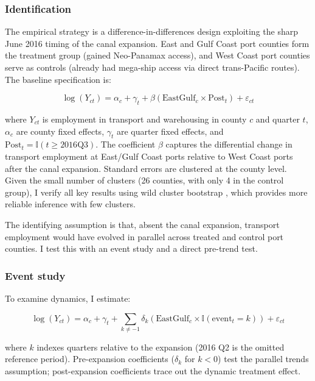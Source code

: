 \documentclass[12pt]{article}
\begin{document}
\subsubsection*{Identification} The empirical strategy is a difference-in-differences design exploiting the sharp June 2016 timing of the canal expansion. East and Gulf Coast port counties form the treatment group (gained Neo-Panamax access), and West Coast port counties serve as controls (already had mega-ship access via direct trans-Pacific routes). The baseline specification is:

\begin{equation}
\log(Y_{ct}) = \alpha_c + \gamma_t + \beta (\text{EastGulf}_c \times \text{Post}_t) + \varepsilon_{ct}
\label{eq:did}
\end{equation}

\noindent where $Y_{ct}$ is employment in transport and warehousing in county $c$ and quarter $t$, $\alpha_c$ are county fixed effects, $\gamma_t$ are quarter fixed effects, and $\text{Post}_t = \mathbb{I}(t \geq 2016\text{Q3})$. The coefficient $\beta$ captures the differential change in transport employment at East/Gulf Coast ports relative to West Coast ports after the canal expansion. Standard errors are clustered at the county level. Given the small number of clusters (26 counties, with only 4 in the control group), I verify all key results using wild cluster bootstrap \citep{cameron2008}, which provides more reliable inference with few clusters.

The identifying assumption is that, absent the canal expansion, transport employment would have evolved in parallel across treated and control port counties. I test this with an event study and a direct pre-trend test.

\subsubsection*{Event study} To examine dynamics, I estimate:

\begin{equation}
\log(Y_{ct}) = \alpha_c + \gamma_t + \sum_{k \neq -1} \delta_k (\text{EastGulf}_c \times \mathbb{I}(\text{event}_t = k)) + \varepsilon_{ct}
\end{equation}

\noindent where $k$ indexes quarters relative to the expansion (2016 Q2 is the omitted reference period). Pre-expansion coefficients ($\delta_k$ for $k < 0$) test the parallel trends assumption; post-expansion coefficients trace out the dynamic treatment effect.
\end{document}

